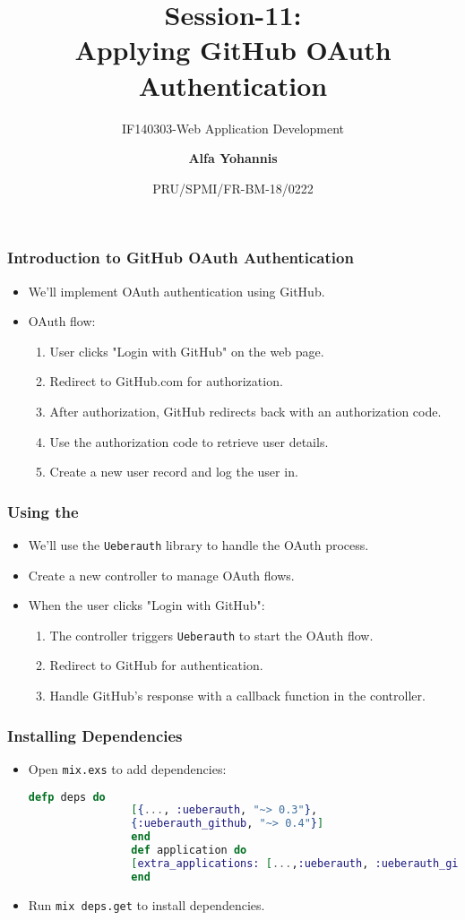 \documentclass[aspectratio=169, table]{beamer}
\subtitle{IF140303-Web Application Development}
\title{\LARGE{Session-11: \\ Applying GitHub OAuth Authentication}}
\date[Serial]{\scriptsize{PRU/SPMI/FR-BM-18/0222}}
\author[Pradita]{\small{\textbf{Alfa Yohannis}}}
\begin{document}
	
	\frame{\titlepage}
	
	\begin{frame}
		\frametitle{Introduction to GitHub OAuth Authentication}
		\begin{itemize}
			\item We'll implement OAuth authentication using GitHub.
			\item OAuth flow:
			\begin{enumerate}
				\item User clicks "Login with GitHub" on the web page.
				\item Redirect to GitHub.com for authorization.
				\item After authorization, GitHub redirects back with an authorization code.
				\item Use the authorization code to retrieve user details.
				\item Create a new user record and log the user in.
			\end{enumerate}
		\end{itemize}
	\end{frame}
	
	\begin{frame}
		\frametitle{Using the }
		\begin{itemize}
			\item We'll use the \texttt{Ueberauth} library to handle the OAuth process.
			\item Create a new controller to manage OAuth flows.
			\item When the user clicks "Login with GitHub":
			\begin{enumerate}
				\item The controller triggers \texttt{Ueberauth} to start the OAuth flow.
				\item Redirect to GitHub for authentication.
				\item Handle GitHub's response with a callback function in the controller.
			\end{enumerate}
		\end{itemize}
	\end{frame}
	
	\begin{frame}[fragile]
		\frametitle{Installing Dependencies}
		\begin{itemize}
			\item Open \texttt{mix.exs} to add dependencies:
			\begin{lstlisting}[language=Elixir]
				defp deps do
				[{..., :ueberauth, "~> 0.3"},
				{:ueberauth_github, "~> 0.4"}]
				end
				def application do
				[extra_applications: [...,:ueberauth, :ueberauth_github]]
				end
			\end{lstlisting}
			\item Run \texttt{mix deps.get} to install dependencies.
		\end{itemize}
	\end{frame}
	
\end{document}

